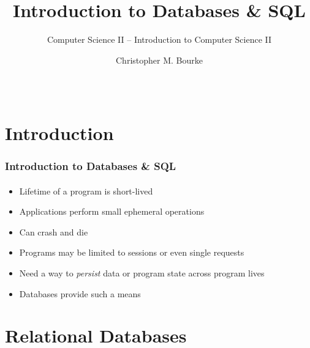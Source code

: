 \documentclass{beamer}
\title[~]{Introduction to Databases \& SQL}
\subtitle{Computer Science II -- Introduction to Computer Science II}
\author[Bourke]{Christopher M. Bourke\\ \email{cbourke@cse.unl.edu}} %
\date{~}
\begin{document}
\begin{frame}
        \titlepage
\end{frame}

\section{Introduction}

\begin{frame}
    \frametitle{Introduction to Databases \& SQL}
    \framesubtitle{}

\begin{itemize}
  \item Lifetime of a program is short-lived
  \item Applications perform small ephemeral operations
  \item Can crash and die
  \item Programs may be limited to sessions or even single requests
  \item Need a way to \emph{persist} data or program state across program lives
  \item Databases provide such a means
\end{itemize}

\end{frame}

%

\section{Relational Databases}
\end{document}
